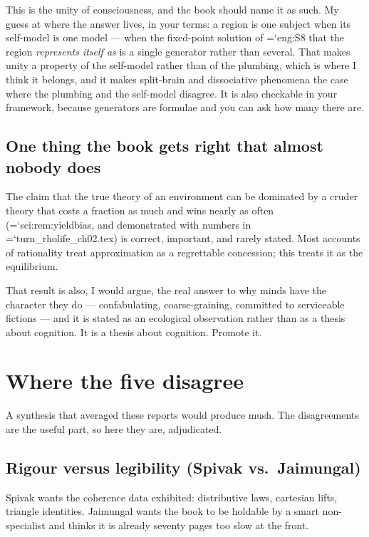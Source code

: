 \documentclass[11pt,letterpaper]{article}
\newcommand{\loc}[1]{{\small\ttfamily\color{accent}\hyphenchar\font=`\-\relax #1}}
\begin{document}
This is the unity of consciousness, and the book should name it as
such. My guess at where the answer lives, in your terms: a region is
one subject when its self-model is one model --- when the fixed-point
solution of \loc{eng:S8} that the region \emph{represents itself as}
is a single generator rather than several. That makes unity a property
of the self-model rather than of the plumbing, which is where I think
it belongs, and it makes split-brain and dissociative phenomena the
case where the plumbing and the self-model disagree. It is also
checkable in your framework, because generators are formulae and you
can ask how many there are.

\subsection*{One thing the book gets right that almost nobody does}

The claim that the true theory of an environment can be dominated by a
cruder theory that costs a fraction as much and wins nearly as often
(\loc{sci:rem:yieldbias}, and demonstrated with numbers in
\loc{turn\_rholife\_ch02.tex}) is correct, important, and rarely
stated. Most accounts of rationality treat approximation as a
regrettable concession; this treats it as the equilibrium.

That result is also, I would argue, the real answer to why minds have
the character they do --- confabulating, coarse-graining, committed to
serviceable fictions --- and it is stated as an ecological observation
rather than as a thesis about cognition. It is a thesis about
cognition. Promote it.

\clearpage
\section{Where the five disagree}
\label{sec:conflict}

A synthesis that averaged these reports would produce mush. The
disagreements are the useful part, so here they are, adjudicated.

\subsection*{Rigour versus legibility (Spivak vs.\ Jaimungal)}

Spivak wants the coherence data exhibited: distributive laws, cartesian
lifts, triangle identities. Jaimungal wants the book to be holdable by
a smart non-specialist and thinks it is already seventy pages too slow
at the front.
\end{document}
